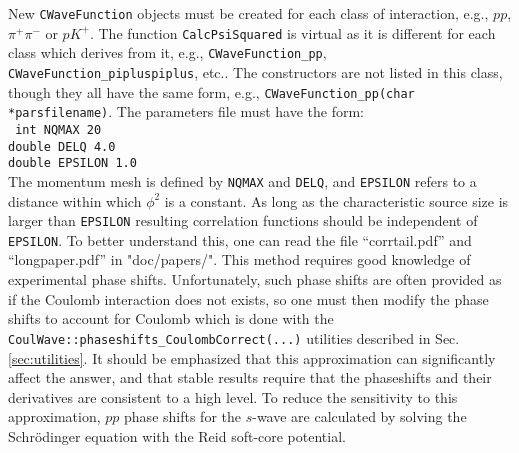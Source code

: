 \documentclass[10pt]{article}
\begin{document}
New {\tt CWaveFunction} objects must be created for each class of interaction, e.g., $pp$, $\pi^+\pi^-$ or $pK^+$. The function {\tt CalcPsiSquared} is virtual as it is different for each class which derives from it, e.g., {\tt CWaveFunction\_pp}, {\tt CWaveFunction\_pipluspiplus}, etc.. The constructors are not listed in this class, though they all have the same form, e.g., {\tt CWaveFunction\_pp(char *parsfilename)}. The parameters file must have the form:\\
{\tt
int NQMAX 20\\
double DELQ 4.0\\
double EPSILON 1.0\\
}
The momentum mesh is defined by {\tt NQMAX} and {\tt DELQ}, and {\tt EPSILON} refers to a distance within which $\phi^2$ is a constant. As long as the characteristic source size is larger than {\tt EPSILON} resulting correlation functions should be independent of {\tt EPSILON}. To better understand this, one can read the file ``corrtail.pdf'' and ``longpaper.pdf'' in "doc/papers/". This method requires good knowledge of experimental phase shifts. Unfortunately, such phase shifts are often provided as if the Coulomb interaction does not exists, so one must then modify the phase shifts to account for Coulomb which is done with the {\tt CoulWave::phaseshifts\_CoulombCorrect(...)} utilities described in Sec. \ref{sec:utilities}. It should be emphasized that this approximation can significantly affect the answer, and that stable results require that the phaseshifts and their derivatives are consistent to a high level. To reduce the sensitivity to this approximation, $pp$ phase shifts for the $s$-wave are calculated by solving the Schr\"odinger equation with the Reid soft-core potential.
\end{document}

